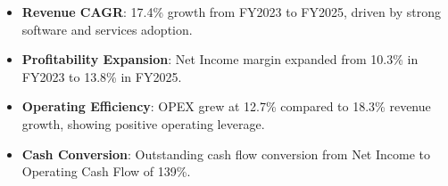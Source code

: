 \begin{minipage}[c]{0.42\textwidth}
  \begin{tcolorbox}[
      colframe=secondary!30,
      colback=white,
      boxrule=0.5pt,
      title=Key Financial Trends,
      fonttitle=\scriptsize\bfseries\color{primary},
      colbacktitle=secondary!10,
      left=6pt, right=6pt, top=6pt, bottom=6pt
  ]
    \scriptsize
    \begin{itemize}[leftmargin=10pt, noitemsep, topsep=0pt]
      \item \textbf{Revenue CAGR}: 17.4\% growth from FY2023 to FY2025, driven by strong software and services adoption.
      \item \textbf{Profitability Expansion}: Net Income margin expanded from 10.3\% in FY2023 to 13.8\% in FY2025.
      \item \textbf{Operating Efficiency}: OPEX grew at 12.7\% compared to 18.3\% revenue growth, showing positive operating leverage.
      \item \textbf{Cash Conversion}: Outstanding cash flow conversion from Net Income to Operating Cash Flow of 139\%.
    \end{itemize}
  \end{tcolorbox}
\end{minipage}

\par\vspace{15pt}
